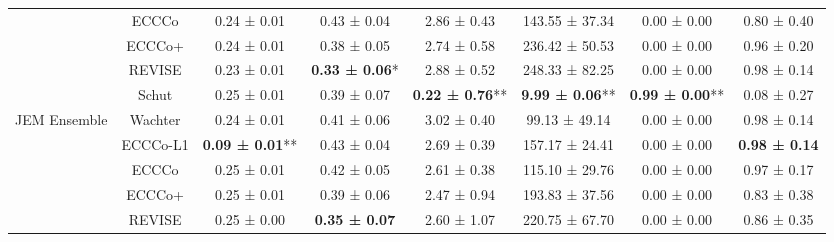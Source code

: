 \begin{table}
{\begin{tabular}[t]{cccccccc}
 & ECCCo & 0.24 ± 0.01\hphantom{*}\hphantom{*} & 0.43 ± 0.04\hphantom{*}\hphantom{*} & 2.86 ± 0.43\hphantom{*}\hphantom{*} & 143.55 ± 37.34\hphantom{*}\hphantom{*} & 0.00 ± 0.00\hphantom{*}\hphantom{*} & 0.80 ± 0.40\hphantom{*}\hphantom{*}\\

 & ECCCo+ & 0.24 ± 0.01\hphantom{*}\hphantom{*} & 0.38 ± 0.05\hphantom{*}\hphantom{*} & 2.74 ± 0.58\hphantom{*}\hphantom{*} & 236.42 ± 50.53\hphantom{*}\hphantom{*} & 0.00 ± 0.00\hphantom{*}\hphantom{*} & 0.96 ± 0.20\hphantom{*}\hphantom{*}\\

 & REVISE & 0.23 ± 0.01\hphantom{*}\hphantom{*} & \textbf{0.33 ± 0.06}*\hphantom{*} & 2.88 ± 0.52\hphantom{*}\hphantom{*} & 248.33 ± 82.25\hphantom{*}\hphantom{*} & 0.00 ± 0.00\hphantom{*}\hphantom{*} & 0.98 ± 0.14\hphantom{*}\hphantom{*}\\

 & Schut & 0.25 ± 0.01\hphantom{*}\hphantom{*} & 0.39 ± 0.07\hphantom{*}\hphantom{*} & \textbf{0.22 ± 0.76}** & \textbf{9.99 ± 0.06}** & \textbf{0.99 ± 0.00}** & 0.08 ± 0.27\hphantom{*}\hphantom{*}\\

\multirow[t]{-6}{*}{\centering\arraybackslash JEM Ensemble} & Wachter & 0.24 ± 0.01\hphantom{*}\hphantom{*} & 0.41 ± 0.06\hphantom{*}\hphantom{*} & 3.02 ± 0.40\hphantom{*}\hphantom{*} & 99.13 ± 49.14\hphantom{*}\hphantom{*} & 0.00 ± 0.00\hphantom{*}\hphantom{*} & 0.98 ± 0.14\hphantom{*}\hphantom{*}\\
\cmidrule{1-8}
 & ECCCo-L1 & \textbf{0.09 ± 0.01}** & 0.43 ± 0.04\hphantom{*}\hphantom{*} & 2.69 ± 0.39\hphantom{*}\hphantom{*} & 157.17 ± 24.41\hphantom{*}\hphantom{*} & 0.00 ± 0.00\hphantom{*}\hphantom{*} & \textbf{0.98 ± 0.14}\hphantom{*}\hphantom{*}\\

 & ECCCo & 0.25 ± 0.01\hphantom{*}\hphantom{*} & 0.42 ± 0.05\hphantom{*}\hphantom{*} & 2.61 ± 0.38\hphantom{*}\hphantom{*} & 115.10 ± 29.76\hphantom{*}\hphantom{*} & 0.00 ± 0.00\hphantom{*}\hphantom{*} & 0.97 ± 0.17\hphantom{*}\hphantom{*}\\

 & ECCCo+ & 0.25 ± 0.01\hphantom{*}\hphantom{*} & 0.39 ± 0.06\hphantom{*}\hphantom{*} & 2.47 ± 0.94\hphantom{*}\hphantom{*} & 193.83 ± 37.56\hphantom{*}\hphantom{*} & 0.00 ± 0.00\hphantom{*}\hphantom{*} & 0.83 ± 0.38\hphantom{*}\hphantom{*}\\

 & REVISE & 0.25 ± 0.00\hphantom{*}\hphantom{*} & \textbf{0.35 ± 0.07}\hphantom{*}\hphantom{*} & 2.60 ± 1.07\hphantom{*}\hphantom{*} & 220.75 ± 67.70\hphantom{*}\hphantom{*} & 0.00 ± 0.00\hphantom{*}\hphantom{*} & 0.86 ± 0.35\hphantom{*}\hphantom{*}\\


\end{tabular}}
\end{table}
